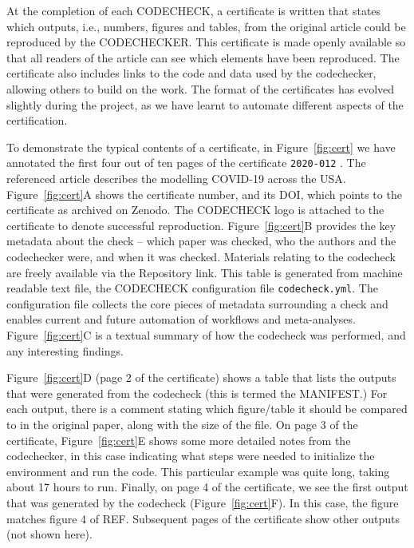 \documentclass[12pt]{article}
\begin{document}
At the completion of each CODECHECK, a certificate is written that
states which outputs, i.e., numbers, figures and tables, from the 
original article could be reproduced by the CODECHECKER.
This certificate is made openly
available so that all readers of the article can see which elements
have been reproduced.  The certificate also includes links to the code
and data used by the codechecker, allowing others to build on the
work.
The format of the certificates has evolved slightly during the
project, as we have learnt to automate different aspects of the
certification.  

To demonstrate the typical contents of a certificate, in
Figure~\ref{fig:cert} we have annotated the first four out of ten
pages of the certificate \texttt{2020-012} \cite{cert-2020-012}.
The referenced article \cite{Unwin2020} describes the modelling COVID-19
across the USA.
Figure~\ref{fig:cert}A shows the certificate number, and its DOI,
which points to the certificate as archived on Zenodo.
The CODECHECK logo is
attached to the certificate to denote successful reproduction.
Figure~\ref{fig:cert}B provides the key metadata about the check --
which paper was checked, who the authors and the codechecker were,
and when it was checked. Materials
relating to the codecheck are freely available via the Repository
link. This table is generated from machine readable text file, the
CODECHECK configuration file \texttt{codecheck.yml}.
The configuration file collects the core pieces of metadata surrounding
a check and enables current and future automation of workflows and 
meta-analyses.
Figure~\ref{fig:cert}C is a textual summary of how the codecheck was
performed, and any interesting findings.

Figure~\ref{fig:cert}D (page 2 of the certificate) shows a table that
lists the outputs that were generated from the codecheck (this is
termed the MANIFEST.)  For each output, there is a comment stating
which figure/table it should be compared to in the original paper,
along with the size of the file.  On page 3 of the certificate,
Figure~\ref{fig:cert}E shows some more detailed notes from the
codechecker, in this case indicating what steps were needed to
initialize the environment and run the code.  This particular example
was quite long, taking about 17 hours to run.  Finally, on page 4 of
the certificate, we see the first output that was generated by the
codecheck (Figure~\ref{fig:cert}F).  In this case, the figure matches
figure 4 of REF.  Subsequent pages of the certificate show other
outputs (not shown here).
\end{document}

